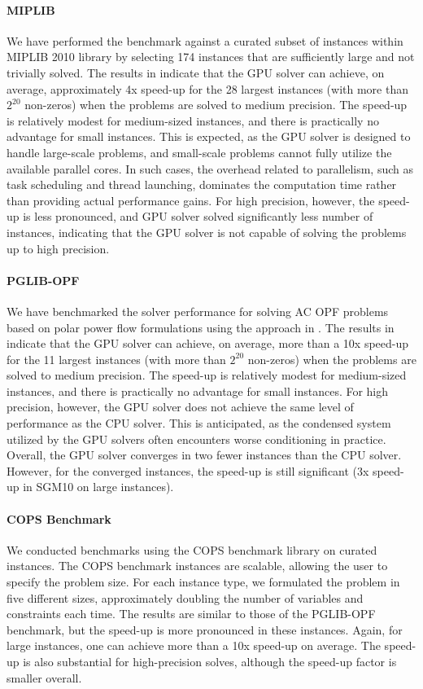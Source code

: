 \documentclass{article}
\begin{document}
\paragraph{MIPLIB}
We have performed the benchmark against a curated subset of instances within MIPLIB 2010 library by selecting 174 instances that are sufficiently large and not trivially solved. The results in  indicate that the GPU solver can achieve, on average, approximately 4x speed-up for the 28 largest instances (with more than $2^{20}$ non-zeros) when the problems are solved to medium precision. The speed-up is relatively modest for medium-sized instances, and there is practically no advantage for small instances. This is expected, as the GPU solver is designed to handle large-scale problems, and small-scale problems cannot fully utilize the available parallel cores. In such cases, the overhead related to parallelism, such as task scheduling and thread launching, dominates the computation time rather than providing actual performance gains. For high precision, however, the speed-up is less pronounced, and GPU solver solved significantly less number of instances, indicating that the GPU solver is not capable of solving the problems up to high precision.


\paragraph{PGLIB-OPF} 
We have benchmarked the solver performance for solving AC OPF problems based on polar power flow formulations using the approach in \cite{PowerModelsJLOpenSource}. The results in  indicate that the GPU solver can achieve, on average, more than a 10x speed-up for the 11 largest instances (with more than $2^{20}$ non-zeros) when the problems are solved to medium precision. The speed-up is relatively modest for medium-sized instances, and there is practically no advantage for small instances. For high precision, however, the GPU solver does not achieve the same level of performance as the CPU solver. This is anticipated, as the condensed system utilized by the GPU solvers often encounters worse conditioning in practice. Overall, the GPU solver converges in two fewer instances than the CPU solver. However, for the converged instances, the speed-up is still significant (3x speed-up in SGM10 on large instances).

\paragraph{COPS Benchmark}
We conducted benchmarks using the COPS benchmark library on curated instances. The COPS benchmark instances are scalable, allowing the user to specify the problem size. For each instance type, we formulated the problem in five different sizes, approximately doubling the number of variables and constraints each time.
The results are similar to those of the PGLIB-OPF benchmark, but the speed-up is more pronounced in these instances.
Again, for large instances, one can achieve more than a 10x speed-up on average. The speed-up is also substantial for high-precision solves, although the speed-up factor is smaller overall.
\end{document}
